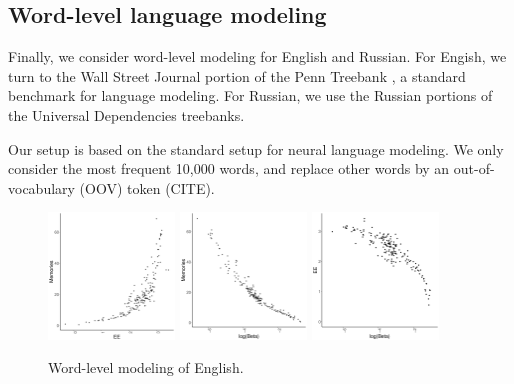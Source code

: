\documentclass[11pt,letterpaper]{article}
\begin{document}
\subsection{Word-level language modeling}

Finally, we consider word-level modeling for English and Russian.
For Engish, we turn to the Wall Street Journal portion of the Penn Treebank \citep{marcus-building-1993}, a standard benchmark for language modeling.
For Russian, we use the Russian portions of the Universal Dependencies treebanks.

Our setup is based on the standard setup for neural language modeling.
We only consider the most frequent 10,000 words, and replace other words by an out-of-vocabulary (OOV) token (CITE).





\begin{figure}
\includegraphics[width=0.3\textwidth]{code/figures/en-words-ee-mem.pdf}
\includegraphics[width=0.3\textwidth]{code/figures/en-words-logbeta-mem.pdf}
\includegraphics[width=0.3\textwidth]{code/figures/en-words-logbeta-ee.pdf}
	\caption{Word-level modeling of English.}\label{fig:eng-logbeta}
\end{figure}
\end{document}
